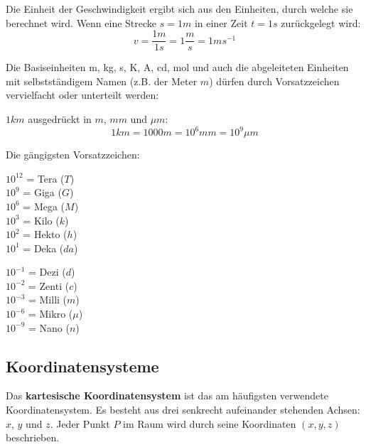 \begin{bspbox}
    Die Einheit der Geschwindigkeit ergibt sich aus den Einheiten, durch welche sie 
    berechnet wird. Wenn eine Strecke $s = 1m$ in einer Zeit $t = 1s$ zurückgelegt wird:
    \begin{equation}
        v = \frac{1m}{1s} = 1 \frac{m}{s} = 1 m s^{-1}
    \end{equation}
\end{bspbox}

Die Basiseinheiten m, kg, s, K, A, cd, mol und auch
die abgeleiteten Einheiten mit selbstständigem
Namen (z.B. der Meter $m$) dürfen durch Vorsatzzeichen 
vervielfacht oder unterteilt werden:

\begin{bspbox}
    $1km$ ausgedrückt in $m$, $mm$ und $\mu m$:
    $$
    1km = 1000m = 10^{6}mm = 10^{9}\mu m
    $$
\end{bspbox}

Die gängigsten Vorsatzzeichen:

\begin{minipage}{.3\textwidth}
    $10^{12}$ = Tera ($T$) \\
    $10^9$ = Giga ($G$) \\
    $10^6$ = Mega ($M$) \\
    $10^3$ = Kilo ($k$) \\
    $10^2$ = Hekto ($h$) \\
    $10^1$ = Deka ($da$)
\end{minipage}
\hspace{.1\textwidth}
\begin{minipage}{.3\textwidth}
    $10^{-1}$ = Dezi ($d$) \\
    $10^{-2}$ = Zenti ($c$) \\
    $10^{-3}$ = Milli ($m$) \\
    $10^{-6}$ = Mikro ($\mu$) \\
    $10^{-9}$ = Nano ($n$)  
\end{minipage}

\subsection{Koordinatensysteme}

Das \textbf{kartesische Koordinatensystem} ist das am häufigsten 
verwendete Koordinatensystem. Es besteht aus drei senkrecht aufeinander 
stehenden Achsen: \(x\), \(y\) und \(z\). Jeder Punkt \(P\) im Raum 
wird durch seine Koordinaten \((x, y, z)\) beschrieben.

